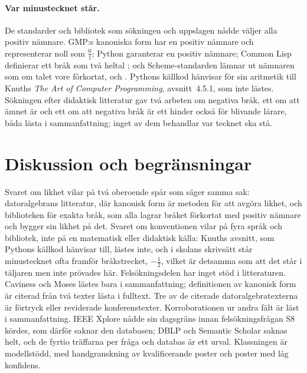 \paragraph{Var minustecknet står.}  De standarder och bibliotek som
sökningen och uppslagen nådde väljer alla positiv nämnare.  GMP:s
kanoniska form har en positiv nämnare och representerar noll som
\(\frac{0}{1}\)\autocite{GMPManual}; Python garanterar en positiv
nämnare\autocite{PythonFractions}; Common Lisp definierar ett bråk som
två heltal ; och
Scheme-standarden lämnar ut nämnaren som om talet vore förkortat, och
.  Pythons
källkod hänvisar för sin aritmetik till Knuths \emph{The Art of
Computer Programming}, avsnitt~4.5.1\autocite{CPythonFractionsSource},
som inte lästes.  Sökningen efter didaktisk litteratur gav två arbeten om negativa bråk,
ett om att ämnet är  och ett om att negativa bråk är ett hinder också för
blivande lärare\autocite{Susiswo2021}, båda lästa i sammanfattning;
inget av dem behandlar var tecknet ska stå.

\section{Diskussion och begränsningar}
\label{sec:kan-diskussion}

Svaret om likhet vilar på två oberoende spår som säger samma sak:
datoralgebrans litteratur, där kanonisk form är metoden för att
avgöra likhet, och biblioteken för exakta bråk, som alla lagrar
bråket förkortat med positiv nämnare och bygger sin likhet på det.
Svaret om konventionen vilar på fyra språk och bibliotek, inte på en
matematisk eller didaktisk källa: Knuths avsnitt, som Pythons källkod
hänvisar till, lästes inte, och i skolans skrivsätt står minustecknet
ofta framför bråkstrecket, \(-\frac{1}{2}\), vilket är detsamma som
att det står i täljaren men inte prövades här.  Felsökningsdelen har
inget stöd i litteraturen.  Caviness och Moses lästes bara i
sammanfattning; definitionen av kanonisk form är citerad från två
texter lästa i fulltext.  Tre av de citerade datoralgebratexterna är
förtryck eller reviderade konferenstexter.  Korroborationen ur andra fält är läst i sammanfattning.  IEEE
Xplore nådde sin dagsgräns innan felsökningsfrågan S8 kördes, som
därför saknar den databasen; DBLP och Semantic Scholar saknas helt, och de fyrtio träffarna
per fråga och databas är ett urval.  Klassningen är modellstödd, med
handgranskning av kvalificerande poster och poster med låg konfidens.

